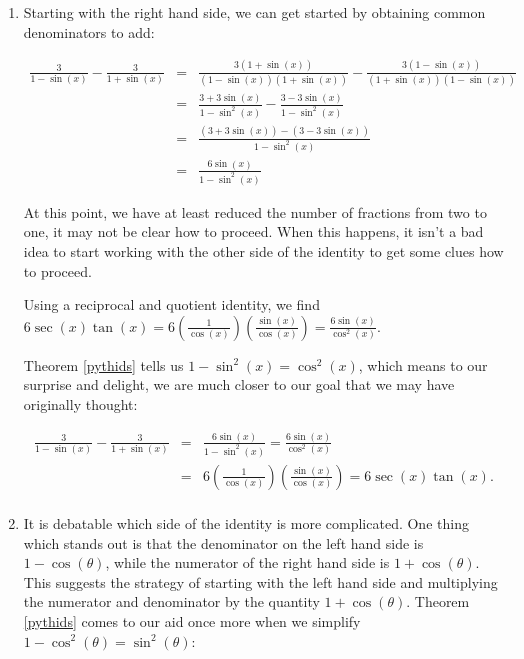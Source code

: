 \documentclass{ximera}
\begin{document}
\begin{example}
\begin{enumerate}
\item Starting with the right hand side, we can get started by obtaining common denominators to add:

\[ \begin{array}{rcl}

\frac{3}{1-\sin(x)} - \frac{3}{1 + \sin(x)} & = & \frac{3(1 + \sin(x))}{(1-\sin(x))(1 + \sin(x))} - \frac{3(1-\sin(x))}{(1 + \sin(x))(1-\sin(x))} \\  
                                                        & = & \frac{3 + 3\sin(x)}{1 - \sin^{2}(x)} - \frac{3 - 3\sin(x)}{1 - \sin^{2}(x)} \\  
                                                        & = & \frac{(3 + 3\sin(x)) - (3 - 3\sin(x))}{1 - \sin^{2}(x)} \\                                                          																																	
                                                        & = & \frac{6 \sin(x)}{1 - \sin^{2}(x)} \end{array} \]

At this point, we have at least reduced the number of fractions from two to one, it may not be clear how to proceed.   When this happens, it isn't a bad idea to start working with the other side of the identity to get some clues how to proceed.

\smallskip

Using a reciprocal and quotient identity, we find $6\sec(x) \tan(x) = 6 \left(\frac{1}{\cos(x)}\right) \left(\frac{\sin(x)}{\cos(x)}\right) = \frac{6 \sin(x)}{\cos^{2}(x)}$.  

\smallskip

Theorem \ref{pythids} tells us $1 -  \sin^{2}(x) = \cos^{2}(x)$, which means to our surprise and delight, we are much closer to our goal that we may have originally thought:

\[ \begin{array}{rcl}

\frac{3}{1-\sin(x)} - \frac{3}{1 + \sin(x)} & = & \frac{6 \sin(x)}{1 - \sin^{2}(x)}= \frac{6 \sin(x)}{\cos^{2}(x)} \\  
& = &  6 \left(\frac{1}{\cos(x)}\right)\left( \frac{\sin(x)}{\cos(x)}\right) = 6 \sec(x) \tan(x). \\ \end{array} \]

\item  It is debatable which side of the identity is more complicated.  One thing which stands out is that the denominator on the left hand side is $1-\cos(\theta)$, while the numerator of the right hand side is $1+\cos(\theta)$.  This suggests the strategy of starting with the left hand side and multiplying the numerator and denominator by the quantity $1+\cos(\theta)$.   Theorem \ref{pythids} comes to our aid once more when we simplify $1-\cos^{2}(\theta) = \sin^{2}(\theta)$:


\end{enumerate}
\end{example}
\end{document}
